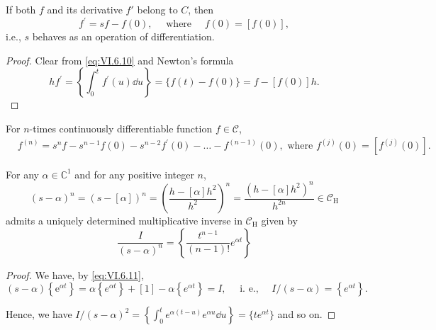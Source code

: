 \begin{proposition}\label{prop:VI.6.Proposition.2} If both $f$ and its derivative $f'$ belong to $C$, then 
\begin{equation}\label{eq:VI.6.11}
f ^{\prime} = s f - f (0), \quad \text{ where } \quad f (0) = [ f (0) ],
\end{equation}
i.e., $s$ behaves as an operation of differentiation. 
\end{proposition}

\begin{proof}
 Clear from \eqref{eq:VI.6.10} and Newton's formula 
\[
h f ^{\prime} = \left\{\int_{0} ^{t} f ^{\prime} (u) \dd u \right\} = \{f (t) - f (0) \} = f - [ f (0) ] h. \]
\end{proof}

\begin{corollaryu} For $n$-times continuously differentiable function $f \in \mathcal{C}$, 
\begin{equation}\label{eq:VI.6.12}
\begin{aligned}
&f ^{(n)} = s ^{n} f - s ^{n-1} f (0) - s ^{n-2} f ^{\prime} (0) - \dots - f ^{(n-1)} (0), \text{ where } f ^{(j)} (0) = [ f ^{(j)} (0) ].
\end{aligned}
\end{equation}
\end{corollaryu}

\begin{proposition}\label{prop:VI.6.Proposition.3} For any $\alpha \in \mathbb{C}^{1}$ and for any positive integer $n$, 
\[
(s - \alpha) ^{n} = (s - [ \alpha ]) ^{n} = \left(\frac {h - [ \alpha ] h ^{2}}{h ^{2}}\right) ^{n} = \frac {(h - [ \alpha ] h ^{2}) ^{n}}{h ^{2n}} \in \mathcal {C} _ {\mathrm{H}}
\]
admits a uniquely determined multiplicative inverse in $\mathcal{C}_{\mathrm{H}}$ given by 
\begin{equation}\label{eq:VI.6.13}
\frac {I}{(s - \alpha) ^{n}} = \left\{\frac {t ^{n-1}}{(n - 1) !} e ^{\alpha t} \right\}
\end{equation}
\end{proposition}

\begin{proof}
 We have, by \eqref{eq:VI.6.11}, 
\[
(s - \alpha) \left\{\mathrm{e} ^{\alpha t} \right\} = \alpha \left\{e ^{\alpha t} \right\} + [ 1 ] - \alpha \left\{e ^{\alpha t} \right\} = I, \quad \text{ i. e., } \quad I / (s - \alpha) = \left\{e ^{\alpha t} \right\}. \]

Hence, we have $I / (s - \alpha)^2 = \left\{\int_{0}^{t} e^{\alpha(t - u)} e^{\alpha u} \dd u\right\} = \{t e^{\alpha t}\}$ and so on. 
\end{proof}

